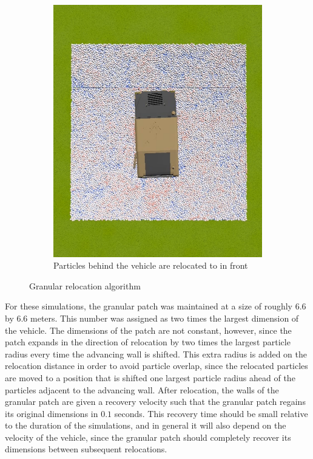 \documentclass[12pt,onecolumn]{report}
\begin{document}
\begin{figure}
\begin{subfigure}[b]{0.49\columnwidth}
		\includegraphics[width=\columnwidth]{Figs/justRelocated.png}
		\caption{\small Particles behind the vehicle are relocated to in front}   
		\label{fig:relocate}
	\end{subfigure}
	\caption{\small Granular relocation algorithm}
	\label{fig:relocationPics}
\end{figure}

For these simulations, the granular patch was maintained at a size of roughly $6.6$ by $6.6$ meters.  This number was assigned as two times the largest dimension of the vehicle. The dimensions of the patch are not constant, however, since the patch expands in the direction of relocation by two times the largest particle radius every time the advancing wall is shifted.  This extra radius is added on the relocation distance in order to avoid particle overlap, since the relocated particles are moved to a position that is shifted one largest particle radius ahead of the particles adjacent to the advancing wall.  After relocation, the walls of the granular patch are given a recovery velocity such that the granular patch regains its original dimensions in $0.1$ seconds.  This recovery time should be small relative to the duration of the simulations, and in general it will also depend on the velocity of the vehicle, since the granular patch should completely recover its dimensions between subsequent relocations.
\end{document}
